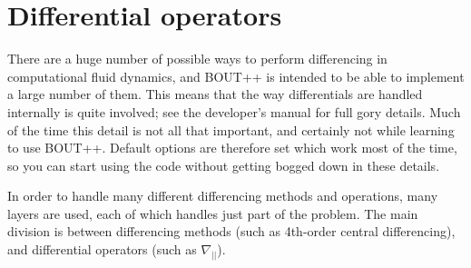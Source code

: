 \documentclass[12pt]{article}
\begin{document}
\section{Differential operators}
\label{sec:diffops}

There are a huge number of possible ways to perform differencing in computational
fluid dynamics, and BOUT++ is intended to be able to implement a large number of them. This
means that the way differentials are handled internally is quite involved; see the
developer's manual for full gory details. Much of the time this detail is not all that
important, and certainly not while learning to use BOUT++. Default options are
therefore set which work most of the time, so you can start using the code without
getting bogged down in these details.

In order to handle many different differencing methods and operations, many layers are
used, each of which handles just part of the problem. The main division is between
differencing methods (such as 4th-order central differencing), and differential operators
(such as $\nabla_{||}$).
\end{document}
